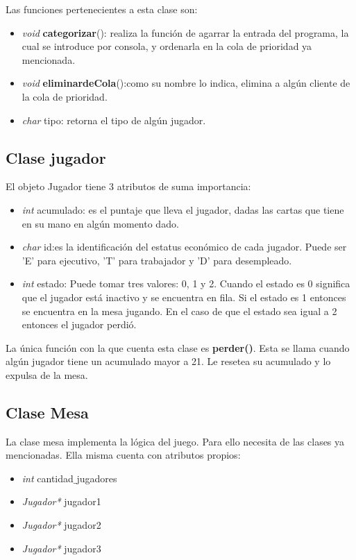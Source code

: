 \documentclass[11pt]{article}
\begin{document}
Las funciones pertenecientes a esta clase son:
\begin{itemize}
\item \textit{void} \textbf{categorizar}(): realiza la función de agarrar la entrada del programa, la cual se introduce por consola, y ordenarla en la cola de prioridad ya mencionada. 
\item \textit{void} \textbf{eliminardeCola}():como su nombre lo indica, elimina a algún cliente de la cola de prioridad.
\item \textit{char} tipo: retorna el tipo de algún jugador.
\end{itemize}
\subsection{Clase jugador}
El objeto Jugador tiene 3 atributos de suma importancia:
\begin{itemize}
\item \textit{int} acumulado: es el puntaje que lleva el jugador, dadas las cartas que tiene en su mano en algún momento dado.
\item \textit{char} id:es la identificación del estatus económico de cada jugador. Puede ser 'E' para ejecutivo, 'T' para trabajador y 'D' para desempleado. 
\item \textit{int} estado: Puede tomar tres valores: 0, 1 y 2. Cuando el estado es 0 significa que el jugador está inactivo y se encuentra en fila. Si el estado es 1 entonces se encuentra en la mesa jugando. En el caso de que el estado sea igual a 2 entonces el jugador perdió. 
\end{itemize}

La única función con la que cuenta esta clase es \textbf{perder()}. Esta se llama cuando algún jugador tiene un acumulado mayor a 21. Le resetea su acumulado y lo expulsa de la mesa. 

\subsection{Clase Mesa}
La clase mesa implementa la lógica del juego. Para ello necesita de las clases ya mencionadas. Ella misma cuenta con atributos propios:
\begin{itemize}
\item \textit{int} cantidad$\_$jugadores
\item \textit{Jugador*} jugador1  
\item \textit{Jugador*} jugador2
\item \textit{Jugador*} jugador3
\end{itemize}
\end{document}
